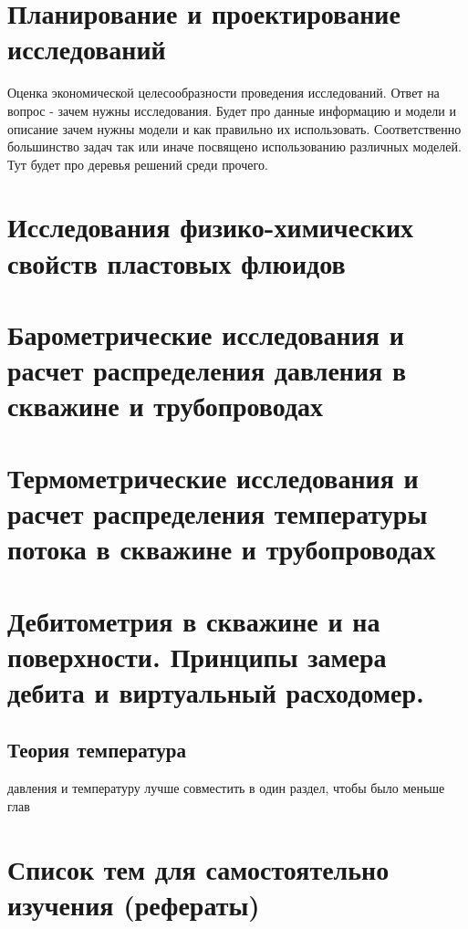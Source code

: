\documentclass{memoir}
\begin{document}


\chapter{Планирование и проектирование исследований}

Оценка экономической целесообразности проведения исследований. Ответ на вопрос - зачем нужны исследования. 
Будет про данные информацию и модели и описание зачем нужны модели и как правильно их использовать.
Соответственно большинство задач так или иначе посвящено использованию различных моделей. 
Тут будет про деревья решений среди прочего.



\chapter{Исследования физико-химических свойств пластовых флюидов}




\chapter{Барометрические исследования и расчет распределения давления в скважине и трубопроводах}



\chapter{Термометрические исследования и расчет распределения температуры потока в скважине и трубопроводах}



\chapter{Дебитометрия в скважине и на поверхности. Принципы замера дебита и виртуальный расходомер.}




\section{Теория температура}

давления и температуру лучше совместить в один раздел, чтобы было меньше глав



\chapter{Список тем для самостоятельно изучения (рефераты)}
\end{document}
